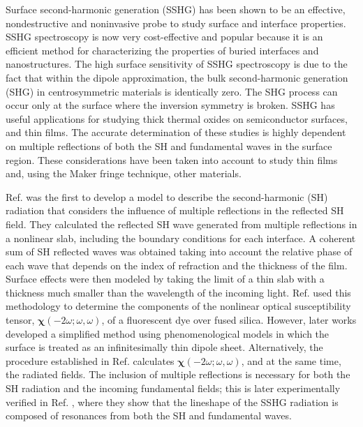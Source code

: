 \documentclass[aps,prb,10pt,showpacs,letterpaper,twocolumn]{revtex4-1}
\begin{document}
Surface second-harmonic generation (SSHG) has been shown to be an effective,
nondestructive and noninvasive probe to study surface and interface
properties.\cite{chenPRL81, shenNAT89, mcgilpOE94, bloembergenAPB99,
mcgilpSRL99, lupkeSSR99, downerPSSA01, downerSIA01} SSHG spectroscopy is now
very cost-effective and popular because it is an efficient method for
characterizing the properties of buried interfaces and nanostructures. The high
surface sensitivity of SSHG spectroscopy is due to the fact that within the
dipole approximation, the bulk second-harmonic generation (SHG) in
centrosymmetric materials is identically zero. The SHG process can occur only at
the surface where the inversion symmetry is broken. SSHG has useful applications
for studying thick thermal oxides on semiconductor
surfaces,\cite{vanhasseltJOSAB95, kolthammerPRB05} and thin
films.\cite{yeganehPRB92} The accurate determination of these studies is highly
dependent on multiple reflections of both the SH and fundamental waves in the
surface region. These considerations have been taken into account to study thin
films\cite{haseAPL92, buinitskayaMJPS02, buinitskayaCAS03} and, using the Maker
fringe technique,\cite{makerPRL62} other materials.\cite{tellierOC07,
abeJOSAB08}

Ref.  was the first to develop a model to describe
the second-harmonic (SH) radiation that considers the influence of multiple
reflections in the reflected SH field. They calculated the reflected SH wave
generated from multiple reflections in a nonlinear slab, including the boundary
conditions for each interface. A coherent sum of SH reflected waves was obtained
taking into account the relative phase of each wave that depends on the index of
refraction and the thickness of the film. Surface effects were then modeled by
taking the limit of a thin slab with a thickness much smaller than the
wavelength of the incoming light. Ref.  used this
methodology to determine the components of the nonlinear optical susceptibility
tensor, $\boldsymbol{\chi}(-2\omega;\omega,\omega)$, of a fluorescent dye over
fused silica. However, later works\cite{sipePRB87, mizrahiJOSA88} developed a
simplified method using phenomenological models in which the surface is treated
as an infinitesimally thin dipole sheet. Alternatively, the procedure
established in Ref.  calculates
$\boldsymbol{\chi}(-2\omega;\omega,\omega)$, and at the same time, the radiated
fields. The inclusion of multiple reflections is necessary for both the SH
radiation and the incoming fundamental fields; this is later experimentally
verified in Ref. , where they show that the lineshape
of the SSHG radiation is composed of resonances from both the SH and fundamental
waves.
\end{document}
